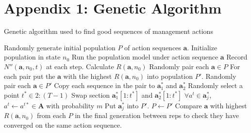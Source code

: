 \documentclass[12pt, a4paper]{article}
\begin{document}
\section*{Appendix 1: Genetic Algorithm}
{
\begin{algorithm}[H]
\caption{Genetic algorithm used to find good sequences of management actions}
\begin{algorithmic}[1]
		\State Randomly generate initial population $P$ of action sequences $\textbf{a}$.
				\State Initialize population in state $n_0$
					\State Run the population model under action sequence $\textbf{a}$ 
					\State Record $N''(\mathbf{a}, n_0, t)$ at each step.
				\EndFor
				\State Calculate $R(\mathbf{a}, n_0)$
			\EndFor
			\State Randomly pair each $\textbf{a} \in P$
			\State For each pair put the $\textbf{a}$ with the highest $R(\mathbf{a}, n_0)$ into population  $P'$.
			\State Randomly pair each $\textbf{a} \in P'$
				\State Copy each sequence in the pair to $\textbf{a}_1^*$ and $\textbf{a}_2^*$ 
				\State Randomly select a point $t^* \in 2:(T - 1)$
				\State Swap section $\textbf{a}_1^*[1:t^*]$ and $\textbf{a}_2^*[1:t^*]$
				\State $\forall a^t \in \textbf{a}_j^*$, $a^t \gets a^{t*} \in \textbf{A}$ with probability $m$  
				\State Put $\textbf{a}_j^*$ into $P'$.   
			\EndFor
			\State $P \gets P'$    
		\EndFor	 
	\EndFor
	\State Compare $\textbf{a}$ with highest $R(\mathbf{a}, n_0)$ from each $P$ in the final generation between reps to check they have converged on the same action sequence.   
\end{algorithmic}
\end{algorithm}}  
\end{document}
